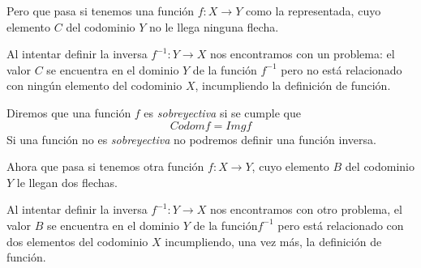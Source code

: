 \documentclass[../teoria.root.tex]{subfiles}
\begin{document}
Pero que pasa si tenemos una función \(f:X\rightarrow Y\) como la representada, cuyo elemento \(C\) del codominio \(Y\) no le llega ninguna flecha.
\begin{center}
\end{center}
Al intentar definir la inversa \(f^{−1}: Y\rightarrow X\) nos encontramos con un problema:
el valor \(C\) se encuentra en el dominio \(Y\) de la función \(f^{−1}\) pero no está relacionado con ningún elemento del codominio \(X\), incumpliendo la definición de función.

Diremos que una función \(f\) es \textit{sobreyectiva} si se cumple que \[Codom f=Img f\] Si una función no es \textit{sobreyectiva} no podremos definir una función inversa.

Ahora que pasa si tenemos otra función \(f:X\rightarrow Y\), cuyo elemento \(B\) del codominio \(Y\) le llegan dos flechas.
\begin{center}
\end{center}
Al intentar definir la inversa \(f^{−1}: Y\rightarrow X\) nos encontramos con otro problema, el valor \(B\) se encuentra en el dominio \(Y\) de la función\(f^{−1}\) pero está relacionado con dos elementos del codominio \(X\) incumpliendo, una vez más, la definición de función.
\end{document}
